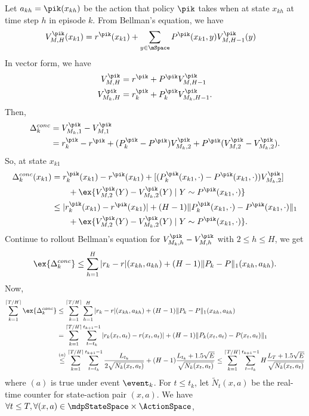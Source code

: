         Let $a_{kh}=\pik(x_{kh})$ be the action that policy $\pik$ takes when at state $x_{kh}$ at time step $h$ in episode $k$. From Bellman's equation, we have
        \begin{align*}
            V^{\pik}_{M,H}(x_{k1})
            &= r^{\pik}(x_{k1}) +\sum_{y\in\mSpace}P^{\pik}(x_{k1},y)V^{\pik}_{M,H-1}(y)
        \end{align*}
        In vector form, we have
        \begin{align*}
            V^{\pik}_{M,H} &= r^{\pik} +P^{\pik}V^{\pik}_{M,H-1} \\
            V^{\pik}_{M_k,H} &= r^{\pik}_k +P^{\pik}_kV^{\pik}_{M_k,H-1}.
        \end{align*}
        Then,
        \begin{align*}
            \Delta_k^{conc}
            &= V^{\pik}_{M_k,1} -V^{\pik}_{M,1} \\
            &= r^{\pik}_k-r^{\pik} +(P^{\pik}_k -P^{\pik})V^{\pik}_{M_k,2} +P^{\pik}(V^{\pik}_{M,2}-V^{\pik}_{M_k,2}).
        \end{align*}
        So, at state $x_{k1}$
        \begin{align*}
            \Delta_k^{conc}(x_{k1})
            &= r^{\pik}_k(x_{k1})-r^{\pik}(x_{k1}) +[(P^{\pik}_k(x_{k1},\cdot) -P^{\pik}(x_{k1},\cdot))V^{\pik}_{M_k,2}] \\
            &\qquad +\ex{V^{\pik}_{M,2}(Y)-V^{\pik}_{M_k,2}(Y) \mid Y\sim P^{\pik}(x_{k1},\cdot)} \\
            &\le \vert r^{\pik}_k(x_{k1}) -r^{\pik}(x_{k1})\vert +(H-1)\Vert P^{\pik}_k(x_{k1},\cdot) -P^{\pik}(x_{k1},\cdot)\Vert_1 \\
            &\qquad +\ex{V^{\pik}_{M,2}(Y)-V^{\pik}_{M_k,2}(Y) \mid Y\sim P^{\pik}(x_{k1},\cdot)}.
        \end{align*}
        Continue to rollout Bellman's equation for $V^{\pik}_{M_k,h}-V^{\pik}_{M,h}$ with $2\le h\le H$, we get
        \begin{align*}
            \ex{\Delta_k^{conc}} \le \sum_{h=1}^{H}\vert r_k-r\vert(x_{kh},a_{kh}) +(H-1)\Vert P_k -P\Vert_1(x_{kh},a_{kh}).
        \end{align*}
        Now,
        \begin{align*}
            \sum_{k=1}^{\lceil T/H\rceil}\ex{\Delta_k^{conc}}
            &\le \sum_{k=1}^{\lceil T/H\rceil} \sum_{h=1}^{H}\vert r_k-r\vert(x_{kh},a_{kh}) +(H-1)\Vert P_k -P\Vert_1(x_{kh},a_{kh}) \\
            &=\sum_{k=1}^{\lceil T/H\rceil} \sum_{t=t_k}^{t_{k+1}-1}\vert r_k(x_t,a_t)-r(x_t,a_t)\vert +(H-1)\Vert P_k(x_t,a_t) -P(x_t,a_t)\Vert_1 \\
            &\overset{(a)}\le \sum_{k=1}^{\lceil T/H\rceil} \sum_{t=t_k}^{t_{k+1}-1} \frac{L_{t_k}}{2\sqrt{N_k(x_t,a_t)}} +(H-1)\frac{L_{t_k}+1.5\sqrt{E}}{\sqrt{N_k(x_t,a_t)}} \le\sum_{k=1}^{\lceil T/H\rceil} \sum_{t=t_k}^{t_{k+1}-1}H\frac{L_T+1.5\sqrt{E}}{\sqrt{N_k(x_t,a_t)}}
        \end{align*}
        where $(a)$ is true under event $\event_k$.
        For $t\le t_k$, let $\tilde{N}_t(x,a)$ be the real-time counter for state-action pair $(x,a)$. We have $\forall t\le T, \forall (x,a)\in \mdpStateSpace\times\ActionSpace$,
        
